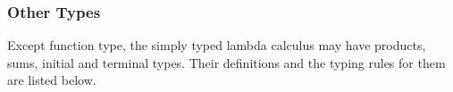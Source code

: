 \subsubsection{Other Types}
\label{sec:bg_lc_ot}
Except function type, the simply typed lambda calculus may have products, sums, initial and terminal types. Their definitions and the typing rules for them are listed below.

\begin{definition}[\textbf{}]
\label{definition:}
\end{definition}